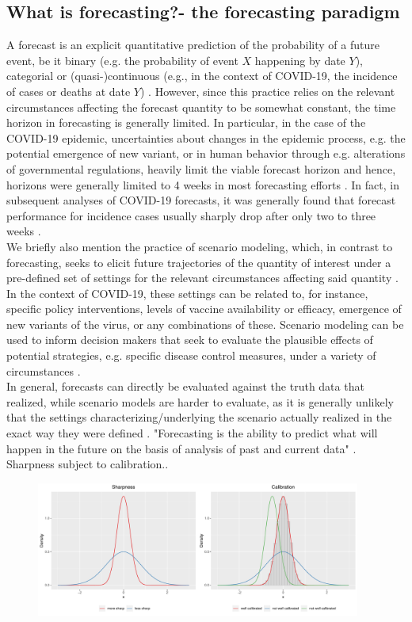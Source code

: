 \subsection{What is forecasting?- the forecasting paradigm}
A forecast is an explicit quantitative prediction of the probability of a future event, be it binary (e.g. the probability of event $X$ happening by date $Y$), categorial or (quasi-)continuous (e.g., in the context of COVID-19, the incidence of cases or deaths at date $Y$) \cite{reich_collaborative_2022}. However, since this practice relies on the relevant circumstances affecting the forecast quantity to be somewhat constant, the time horizon in forecasting is generally limited. In particular, in the case of the COVID-19 epidemic, uncertainties about changes in the epidemic process, e.g. the potential emergence of new variant, or in human behavior through e.g. alterations of governmental regulations, heavily limit the viable forecast horizon and hence, horizons were generally limited to 4 weeks in most forecasting efforts \cite{reich_collaborative_2022}. In fact, in subsequent analyses of COVID-19 forecasts, it was generally found that forecast performance for incidence cases usually sharply drop after only two to three weeks .\\
We briefly also mention the practice of scenario modeling, which, in contrast to forecasting, seeks to elicit future trajectories of the quantity of interest under a pre-defined set of settings for the relevant circumstances affecting said quantity \cite{reich_collaborative_2022}. In the context of COVID-19, these settings can be related to, for instance, specific policy interventions, levels of vaccine availability or efficacy, emergence of new variants of the virus, or any combinations of these. Scenario modeling can be used to inform decision makers that seek to evaluate the plausible effects of potential strategies, e.g. specific disease control measures, under a variety of circumstances \cite{reich_collaborative_2022}.\\ 
In general, forecasts can directly be evaluated against the truth data that realized, while scenario models are harder to evaluate, as it is generally unlikely that the settings characterizing/underlying the scenario actually realized in the exact way they were defined \cite{reich_collaborative_2022}.
"Forecasting is the ability to predict what will happen in the future on the basis of analysis of past and current data" \cite{moran_epidemic_2016}.
Sharpness subject to calibration.\cite{ray_ensemble_2020}.
\begin{figure}
\centering
\includegraphics[width = 0.95\textwidth]{../plots/sharp_calib.pdf}
\end{figure}

